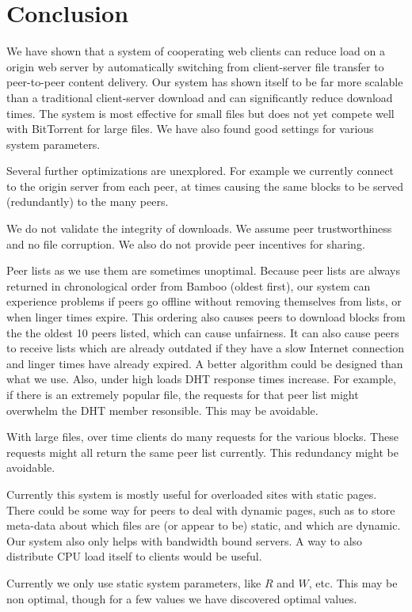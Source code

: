 \section{Conclusion}

We have shown that a system of cooperating web clients can reduce load on a origin web server by automatically switching
from client-server file transfer to peer-to-peer content delivery. Our system has shown itself to be far more scalable 
than a traditional client-server download and can significantly
reduce download times.  The system is most effective for small files but does not yet compete well with
BitTorrent for large files.  We have also found good settings for various system parameters.

Several further optimizations are unexplored.  For example we currently connect to the origin
server from each peer, at times causing the same blocks to be served (redundantly) to the many peers.

We do not validate the integrity of downloads.  We assume peer trustworthiness and no file corruption.  We also do not provide peer incentives for sharing.

Peer lists as we use them are sometimes unoptimal.  Because peer lists are always returned in chronological order from Bamboo (oldest first), our system can experience problems if peers
go offline without removing themselves from lists, or when linger times expire.  This ordering also causes peers to download blocks 
from the the oldest 10 peers listed, which can cause unfairness. It can also cause peers to receive lists which
are already outdated if they have a slow Internet connection and linger times have already expired.  A better algorithm could be designed than what we use.
Also, under high loads DHT response times increase.  For example, if there is an extremely popular file, the requests for that peer list might overwhelm the DHT member resonsible. 
This may be avoidable.

With large files, over time clients do many requests for the various blocks.  These requests might all return the same
peer list currently.  This redundancy might be avoidable.

Currently this system is mostly useful for overloaded sites with static pages.  There could be some way for peers to deal with dynamic pages, such as to
store meta-data about which files are (or appear to be) static, and which are dynamic.  
Our system also only helps with bandwidth bound servers.  A way to also distribute CPU load itself to clients would be useful.

Currently we only use static system parameters, like $R$ and $W$, etc.  This may be non optimal, though for a few values we have discovered optimal values.